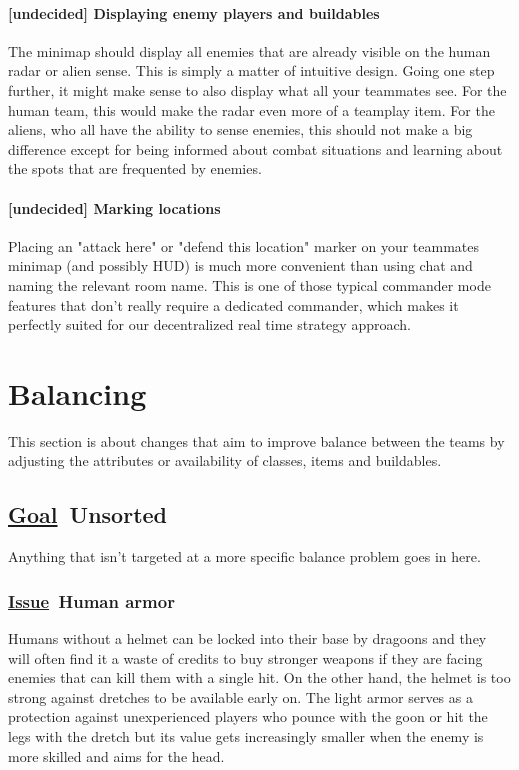 \documentclass{scrartcl}
\newcommand{\goal}     [0]{\textbf{\underline{Goal}\ }}
\newcommand{\issue}    [0]{\textbf{\underline{Issue}\ }}
\newcommand{\undecided}[0]{\textcolor{undecided}{\textbf{[undecided] }}}
\begin{document}
\paragraph{\undecided Displaying enemy players and buildables}

The minimap should display all enemies that are already visible on the human radar or alien sense. This is simply a matter of intuitive design. Going one step further, it might make sense to also display what all your teammates see. For the human team, this would make the radar even more of a teamplay item. For the aliens, who all have the ability to sense enemies, this should not make a big difference except for being informed about combat situations and learning about the spots that are frequented by enemies.

\paragraph{\undecided Marking locations}

Placing an "attack here" or "defend this location" marker on your teammates minimap (and possibly HUD) is much more convenient than using chat and naming the relevant room name. This is one of those typical commander mode features that don't really require a dedicated commander, which makes it perfectly suited for our decentralized real time strategy approach.

\section{Balancing}

This section is about changes that aim to improve balance between the teams by adjusting the attributes or availability of classes, items and buildables.

\subsection{\goal Unsorted}

Anything that isn't targeted at a more specific balance problem goes in here.

\subsubsection{\issue Human armor}

Humans without a helmet can be locked into their base by dragoons and they will often find it a waste of credits to buy stronger weapons if they are facing enemies that can kill them with a single hit. On the other hand, the helmet is too strong against dretches to be available early on. The light armor serves as a protection against unexperienced players who pounce with the goon or hit the legs with the dretch but its value gets increasingly smaller when the enemy is more skilled and aims for the head.
\end{document}
